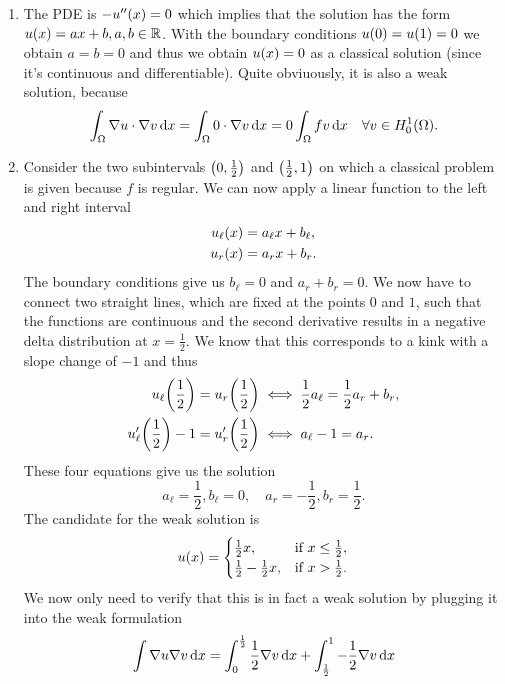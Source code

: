 \documentclass[english]{exercise}
\begin{document}
	\begin{enumerate}
		\item The PDE is \(-u''\parentheses*{x} = 0\) which implies that the solution has the form \(u\parentheses*{x} = ax + b, a, b \in \R\).
		With the boundary conditions \(u\parentheses*{0} = u\parentheses*{1} = 0\) we obtain \(a = b = 0\) and thus we obtain \(u\parentheses*{x} = 0\) as a classical solution (since it's continuous and differentiable).
		Quite obviuously, it is also a weak solution, because
		\[
			\int_\Omega \nabla u \cdot \nabla v\d x = \int_\Omega 0 \cdot \nabla v\d x = 0 \int_\Omega fv\d x \quad \forall v \in H_0^1\parentheses*{\Omega}.
		\]
		\item Consider the two subintervals \(\parentheses*{0, \frac{1}{2}}\) and \(\parentheses*{\frac{1}{2}, 1}\) on which a classical problem is given because \(f\) is regular.
		We can now apply a linear function to the left and right interval
		\begin{align*}
			u_\ell\parentheses*{x} &= a_\ell x + b_\ell,\\
			u_r\parentheses*{x} &= a_r x + b_r.
		\end{align*}
		The boundary conditions give us \(b_\ell = 0\) and \(a_r + b_r = 0\).
		We now have to connect two straight lines, which are fixed at the points \(0\) and \(1\), such that the functions are continuous and the second derivative results in a negative delta distribution at \(x = \frac{1}{2}\).
		We know that this corresponds to a kink with a slope change of \(-1\) and thus
		\begin{align*}
			u_\ell\parentheses*{\frac{1}{2}} = u_r\parentheses*{\frac{1}{2}} &\iff \frac{1}{2}a_\ell = \frac{1}{2}a_r + b_r,\\
			u_\ell'\parentheses*{\frac{1}{2}} - 1 = u_r'\parentheses*{\frac{1}{2}} &\iff a_\ell - 1 = a_r.
		\end{align*}
		These four equations give us the solution
		\[
			a_\ell = \frac{1}{2}, b_\ell = 0, \quad a_r = -\frac{1}{2}, b_r = \frac{1}{2}.
		\]
		The candidate for the weak solution is
		\[
			u\parentheses*{x} = \begin{cases}
				\frac{1}{2}x, & \text{if }x \le \frac{1}{2},\\
				\frac{1}{2} - \frac{1}{2}x, & \text{if }x > \frac{1}{2}.
			\end{cases}
		\]
		We now only need to verify that this is in fact a weak solution by plugging it into the weak formulation
		\begin{align*}
			\int\nabla u\nabla v\d x &= \int_0^{\frac{1}{2}}\frac{1}{2}\nabla v\d x + \int_{\frac{1}{2}}^1 -\frac{1}{2}\nabla v\d x\\

\end{align*}
\end{enumerate}
\end{document}
